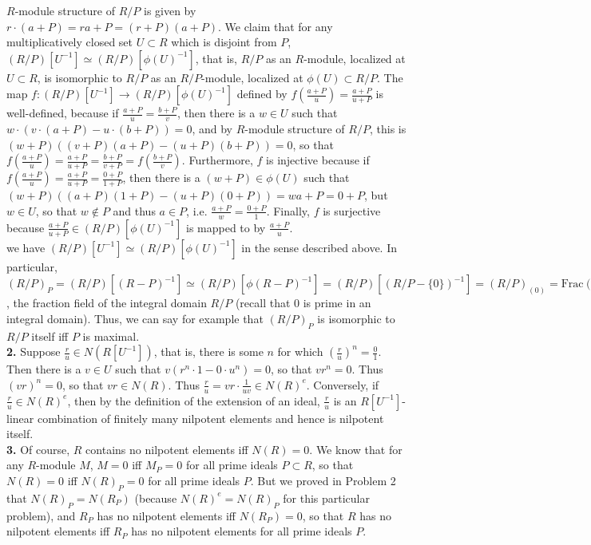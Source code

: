 \documentclass[11pt]{article}
\newcommand{\num}[1]{\noindent \textbf{#1}}
\theoremstyle{definition}
\begin{document}
$R$-module structure of $R/P$ is given by $r\cdot(a+P)=ra+P=(r+P)(a+P)$. We
claim that for any multiplicatively closed set $U\subset R$ which
is disjoint from $P$, $(R/P)[U^{-1}]\simeq (R/P)[\phi(U)^{-1}]$,
that is, $R/P$ as an $R$-module, localized at $U\subset R$, is
isomorphic to $R/P$ as an $R/P$-module, localized at $\phi(U)\subset
R/P$. The map $f:(R/P)[U^{-1}]\rightarrow(R/P)[\phi(U)^{-1}]$
defined by $f(\frac{a+P}{u})=\frac{a+P}{u+P}$ is well-defined,
because if $\frac{a+P}{u}=\frac{b+P}{v}$, then there is a $w\in U$
such that $w\cdot(v\cdot(a+P)-u\cdot(b+P))=0$, and by $R$-module
structure of $R/P$, this is $(w+P)((v+P)(a+P)-(u+P)(b+P))=0$, so that
$f(\frac{a+P}{u})=\frac{a+P}{u+P}=\frac{b+P}{v+P}=f(\frac{b+P}{v})$.
Furthermore, $f$ is injective because if
$f(\frac{a+P}{u})=\frac{a+P}{u+P}=\frac{0+P}{1+P}$, then there is a
$(w+P)\in\phi(U)$ such that $(w+P)((a+P)(1+P)-(u+P)(0+P))=wa+P=0+P$,
but $w\in U$, so that $w\notin P$ and thus $a\in P$,
i.e. $\frac{a+P}{w}=\frac{0+P}{1}$. Finally, $f$ is surjective because
$\frac{a+P}{u+P}\in(R/P)[\phi(U)^{-1}]$ is mapped to by $\frac{a+P}{u}$. \\

we have $(R/P)[U^{-1}]\simeq(R/P)[\phi(U)^{-1}]$
in the sense described above. In particular,
$(R/P)_P=(R/P)[(R-P)^{-1}]\simeq(R/P)[\phi(R-P)^{-1}]=(R/P)[(R/P-\{0\})^{-1}]=(R/P)_{(0)}=\text{Frac}(R/P)$,
the fraction field of the integral domain $R/P$ (recall that $0$ is prime
in an integral domain). Thus, we can say for example that $(R/P)_P$ is
isomorphic to $R/P$ itself iff $P$ is maximal.     \\

\num{2.} Suppose $\frac{r}{u}\in N(R[U^{-1}])$, that is, there is some $n$ for
which $\left(\frac{r}{u}\right)^n=\frac{0}{1}$. Then there is a $v\in U$ such
that $v(r^n\cdot1-0\cdot u^n)=0$, so that $vr^n=0$. Thus $(vr)^n=0$, so that
$vr\in N(R)$. Thus $\frac{r}{u}=vr\cdot\frac{1}{uv}\in N(R)^e$. Conversely,
if $\frac{r}{u}\in N(R)^e$, then by the definition of the extension of an
ideal, $\frac{r}{u}$ is an $R[U^{-1}]$-linear combination of finitely many
nilpotent elements and hence is nilpotent itself.     \\

\num{3.} Of course, $R$ contains no nilpotent elements iff $N(R)=0$. We know
that for any $R$-module $M$, $M=0$ iff $M_P=0$ for all prime ideals $P\subset
R$, so that $N(R)=0$ iff $N(R)_P=0$ for all prime ideals $P$. But we proved in
Problem 2 that $N(R)_P=N(R_P)$ (because $N(R)^e=N(R)_P$ for this particular
problem), and $R_P$ has no nilpotent elements iff $N(R_P)=0$, so that $R$
has no nilpotent elements iff $R_P$ has no nilpotent elements for all prime
ideals $P$.     \\
\end{document}
